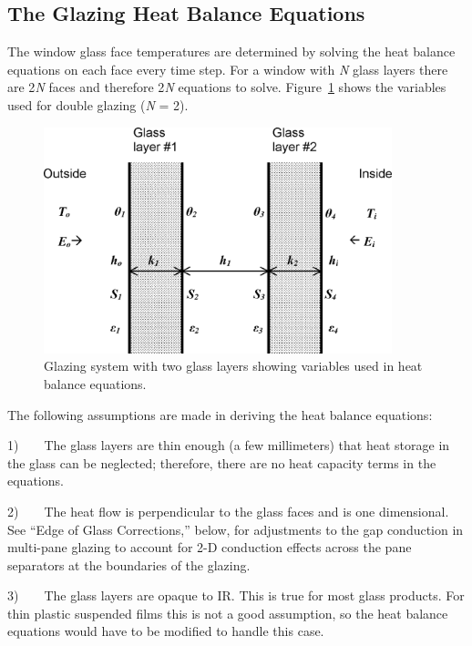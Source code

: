 \subsection{The Glazing Heat Balance Equations}\label{the-glazing-heat-balance-equations}

The window glass face temperatures are determined by solving the heat balance equations on each face every time step. For a window with \emph{N} glass layers there are 2\emph{N} faces and therefore 2\emph{N} equations to solve. Figure~\ref{fig:glazing-system-with-two-glass-layers-showing} shows the variables used for double glazing (\emph{N} = 2).

\begin{figure}[hbtp] %
\centering
\includegraphics[width=0.9\textwidth, height=0.9\textheight, keepaspectratio=true]{media/image1470.png}
\caption{Glazing system with two glass layers showing variables used in heat balance equations. \protect \label{fig:glazing-system-with-two-glass-layers-showing}}
\end{figure}

The following assumptions are made in deriving the heat balance equations:

1)~~~~The glass layers are thin enough (a few millimeters) that heat storage in the glass can be neglected; therefore, there are no heat capacity terms in the equations.

2)~~~~The heat flow is perpendicular to the glass faces and is one dimensional. See ``Edge of Glass Corrections,'' below, for adjustments to the gap conduction in multi-pane glazing to account for 2-D conduction effects across the pane separators at the boundaries of the glazing.

3)~~~~The glass layers are opaque to IR. This is true for most glass products. For thin plastic suspended films this is not a good assumption, so the heat balance equations would have to be modified to handle this case.

